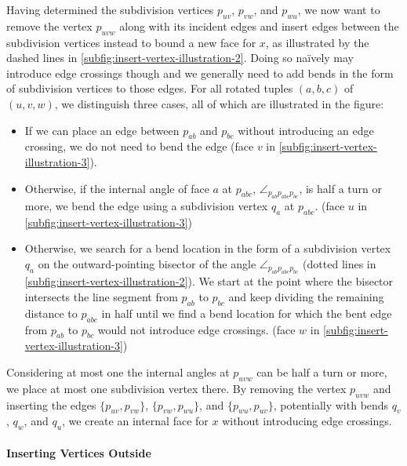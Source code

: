 Having determined the subdivision vertices $p_{uv}$, $p_{vw}$, and $p_{wu}$, we now want to remove the vertex $p_{uvw}$ along with its incident edges and insert edges between the subdivision vertices instead to bound a new face for $x$, as illustrated by the dashed lines in \cref{subfig:insert-vertex-illustration-2}.
Doing so naïvely may introduce edge crossings though and we generally need to add bends in the form of subdivision vertices to those edges.
For all rotated tuples $(a,b,c)$ of $(u,v,w)$, we distinguish three cases, all of which are illustrated in the figure:
%
%
\begin{itemize}
\item If we can place an edge between $p_{ab}$ and $p_{bc}$ without introducing an edge crossing, we do not need to bend the edge (face $v$ in \cref{subfig:insert-vertex-illustration-3}).
\item Otherwise, if the internal angle of face $a$ at $p_{abc}$, $\angle_{p_{ab}p_{abc}p_{bc}}$, is half a turn or more, we bend the edge using a subdivision vertex $q_a$ at $p_{abc}$.
(face $u$ in \cref{subfig:insert-vertex-illustration-3})
\item Otherwise, we search for a bend location in the form of a subdivision vertex $q_a$ on the outward-pointing bisector of the angle $\angle_{p_{ab}p_{abc}p_{bc}}$ (dotted lines in \cref{subfig:insert-vertex-illustration-2}).
We start at the point where the bisector intersects the line segment from $p_{ab}$ to $p_{bc}$ and keep dividing the remaining distance to $p_{abc}$ in half until we find a bend location for which the bent edge from $p_{ab}$ to $p_{bc}$ would not introduce edge crossings.
(face $w$ in \cref{subfig:insert-vertex-illustration-3})
\end{itemize}

Considering at most one the internal angles at $p_{uvw}$ can be half a turn or more, we place at most one subdivision vertex there.
By removing the vertex $p_{uvw}$ and inserting the edges $\{p_{uv},p_{vw}\}$, $\{p_{vw},p_{wu}\}$, and $\{p_{wu},p_{uv}\}$, potentially with bends $q_v$, $q_w$, and $q_u$, we create an internal face for $x$ without introducing edge crossings.



\paragraph{Inserting Vertices Outside}

